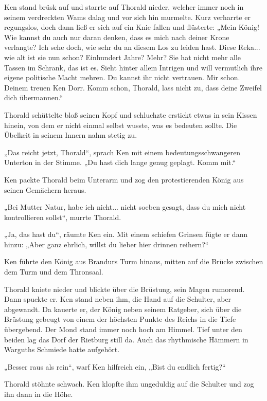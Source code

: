 Ken stand brüsk auf und starrte auf Thorald nieder, welcher immer noch in seinem verdreckten Wams dalag und vor sich hin murmelte. Kurz verharrte er regungslos, doch dann ließ er sich auf ein Knie fallen und flüsterte: „Mein König! Wie kannst du auch nur daran denken, dass es mich nach deiner Krone verlangte? Ich sehe doch, wie sehr du an diesem Los zu leiden hast. Diese Reka... wie alt ist sie nun schon? Einhundert Jahre? Mehr? Sie hat nicht mehr alle Tassen im Schrank, das ist es. Sieht hinter allem Intrigen und will vermutlich ihre eigene politische Macht mehren. Du kannst ihr nicht vertrauen. Mir schon. Deinem treuen Ken Dorr. Komm schon, Thorald, lass nicht zu, dass deine Zweifel dich übermannen.“

Thorald schüttelte bloß seinen Kopf und schluchzte erstickt etwas in sein Kissen hinein, von dem er nicht einmal selbst wusste, was es bedeuten sollte. Die Übelkeit in seinem Innern nahm stetig zu.

„Das reicht jetzt, Thorald“, sprach Ken mit einem bedeutungsschwangeren Unterton in der Stimme. „Du hast dich lange genug geplagt. Komm mit.“

Ken packte Thorald beim Unterarm und zog den protestierenden König aus seinen Gemächern heraus.

„Bei Mutter Natur, habe ich nicht... nicht soeben gesagt, dass du mich nicht kontrollieren sollst“, murrte Thorald.

„Ja, das hast du“, räumte Ken ein. Mit einem schiefen Grinsen fügte er dann hinzu: „Aber ganz ehrlich, willst du lieber hier drinnen reihern?“



\trennzeichen



Ken führte den König aus Brandurs Turm hinaus, mitten auf die Brücke zwischen dem Turm und dem Thronsaal.

Thorald kniete nieder und blickte über die Brüstung, sein Magen rumorend. Dann spuckte er. Ken stand neben ihm, die Hand auf die Schulter, aber abgewandt. Da kauerte er, der König neben seinem Ratgeber, sich über die Brüstung gebeugt von einem der höchsten Punkte des Reichs in die Tiefe übergebend. Der Mond stand immer noch hoch am Himmel. Tief unter den beiden lag das Dorf der Rietburg still da. Auch das rhythmische Hämmern in Warguths Schmiede hatte aufgehört.

„Besser raus als rein“, warf Ken hilfreich ein, „Bist du endlich fertig?“

Thorald stöhnte schwach. Ken klopfte ihm ungeduldig auf die Schulter und zog ihn dann in die Höhe.

